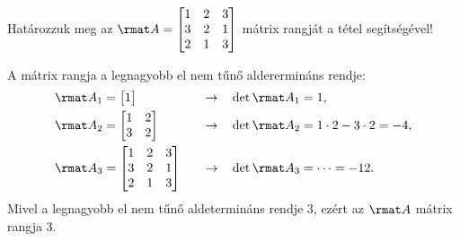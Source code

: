 \documentclass[a4paper, 12pt]{scrartcl}
\begin{document}
\begin{example}
  Határozzuk meg az $\rmat A = \begin{bmatrix}
      1 & 2 & 3 \\
      3 & 2 & 1 \\
      2 & 1 & 3
    \end{bmatrix}$ mátrix rangját a tétel segítségével!

  A mátrix rangja a legnagyobb el nem tűnő alderermináns rendje:
  \begin{alignat*}{9}
    \rmat A_1
     & = \begin{bmatrix}
           1
         \end{bmatrix}
     & \quad \rightarrow \quad
     & \det \rmat A_1 = 1
    \text,
    \\
    \rmat A_2
     & = \begin{bmatrix}
           1 & 2 \\
           3 & 2
         \end{bmatrix}
     & \quad \rightarrow \quad
     & \det \rmat A_2 = 1 \cdot 2 - 3 \cdot 2 = -4
    \text,
    \\
    \rmat A_3
     & = \begin{bmatrix}
           1 & 2 & 3 \\
           3 & 2 & 1 \\
           2 & 1 & 3
         \end{bmatrix}
     & \quad \rightarrow \quad
     & \det \rmat A_3 = \dots = -12
    \text.
  \end{alignat*}
  Mivel a legnagyobb el nem tűnő aldetermináns rendje 3, ezért az $\rmat A$
  mátrix rangja 3.
\end{example}
\end{document}
